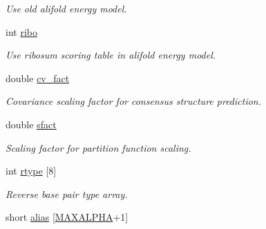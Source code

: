 \begin{DoxyCompactItemize}
\begin{DoxyCompactList}\small\item\em Use old alifold energy model. \end{DoxyCompactList}\item 
\hypertarget{group__model__details_a3df2ae4bd9c133ef8ab92a53b1d035ec}{}int \hyperlink{group__model__details_a3df2ae4bd9c133ef8ab92a53b1d035ec}{ribo}\label{group__model__details_a3df2ae4bd9c133ef8ab92a53b1d035ec}

\begin{DoxyCompactList}\small\item\em Use ribosum scoring table in alifold energy model. \end{DoxyCompactList}\item 
\hypertarget{group__model__details_a62ebefb9d0643e5c4c8a2ec84a105ce6}{}double \hyperlink{group__model__details_a62ebefb9d0643e5c4c8a2ec84a105ce6}{cv\+\_\+fact}\label{group__model__details_a62ebefb9d0643e5c4c8a2ec84a105ce6}

\begin{DoxyCompactList}\small\item\em Covariance scaling factor for consensus structure prediction. \end{DoxyCompactList}\item 
\hypertarget{group__model__details_ab6f4cabaa9b4726b13592486d5bc21c7}{}double \hyperlink{group__model__details_ab6f4cabaa9b4726b13592486d5bc21c7}{sfact}\label{group__model__details_ab6f4cabaa9b4726b13592486d5bc21c7}

\begin{DoxyCompactList}\small\item\em Scaling factor for partition function scaling. \end{DoxyCompactList}\item 
\hypertarget{group__model__details_ad082d0fea31e002b90cdfe5e6382f8b0}{}int \hyperlink{group__model__details_ad082d0fea31e002b90cdfe5e6382f8b0}{rtype} \mbox{[}8\mbox{]}\label{group__model__details_ad082d0fea31e002b90cdfe5e6382f8b0}

\begin{DoxyCompactList}\small\item\em Reverse base pair type array. \end{DoxyCompactList}\item 
\hypertarget{group__model__details_a66136cf9abc8ff790ec0d33245d68fd5}{}short \hyperlink{group__model__details_a66136cf9abc8ff790ec0d33245d68fd5}{alias} \mbox{[}\hyperlink{group__model__details_ga05a5ffe718aa431d97419a12fb082379}{M\+A\+X\+A\+L\+P\+H\+A}+1\mbox{]}\label{group__model__details_a66136cf9abc8ff790ec0d33245d68fd5}


\end{DoxyCompactItemize}
